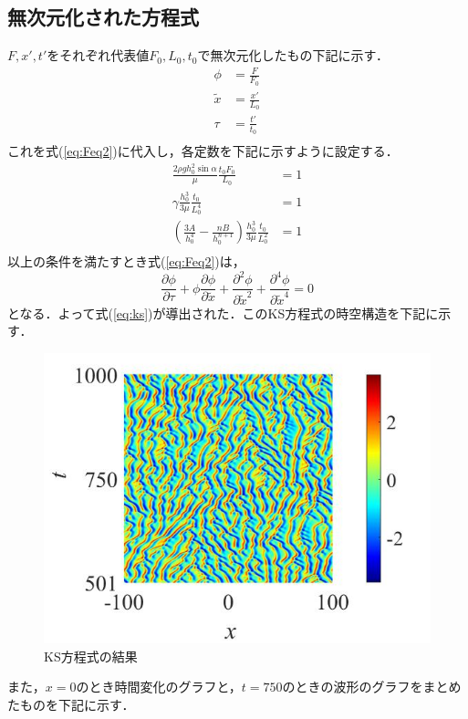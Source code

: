 \documentclass[autodetect-engine,dvipdfmx-if-dvi,ja=standard,a4paper,11pt]{bxjsarticle} %
\begin{document}
\subsection{無次元化された方程式}
$F,x',t'$をそれぞれ代表値$F_0,L_0,t_0$で無次元化したもの下記に示す．
\begin{equation}
\begin{split}
\phi&=\frac{F}{F_0}\\
\tilde{x}&=\frac{x'}{L_0}\\
\tau&=\frac{t'}{t_0}\\
\label{eq:norm}
\end{split}
\end{equation}
これを式(\ref{eq:Feq2})に代入し，各定数を下記に示すように設定する．
\begin{equation}
\begin{split}
\frac{2\rho gh_0^2\sin\alpha}{\mu}\frac{t_0F_0}{L_0}&=1\\
\gamma\frac{h_0^3}{3\mu}\frac{t_0}{L_0^4}&=1\\
\left(\frac{3A}{h_0^4}-\frac{nB}{h_0^{n+1}}\right)\frac{h_0^3}{3\mu}\frac{t_0}{L_0^2}&=1\\
\label{eq:para}
\end{split}
\end{equation}
以上の条件を満たすとき式(\ref{eq:Feq2})は，
\begin{equation}
\frac{\partial\phi}{\partial\tau}+\phi\frac{\partial\phi}{\partial\tilde{x}}+\frac{\partial^2\phi}{\partial\tilde{x}^2}+\frac{\partial^4\phi}{\partial\tilde{x}^4}=0
\label{eq:phieq}
\end{equation}
となる．よって式(\ref{eq:ks})が導出された．このKS方程式の時空構造を下記に示す．

\begin{figure}[H]%
\begin{center}
\includegraphics[width=.4\textwidth]{KS_result.jpg} 
\end{center}
\caption{KS方程式の結果}%
\label{fig:ks}%
\end{figure}
また，$x=0$のとき時間変化のグラフと，$t=750$のときの波形のグラフをまとめたものを下記に示す．
\end{document}
